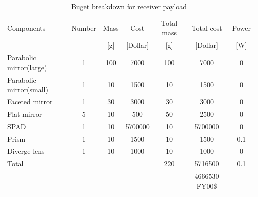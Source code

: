 \begin{table}[ht!]
\begin{tabular}{l | c | c c | c c | c }
Components         & Number & Mass & Cost      & Total mass & Total cost & Power\\ 
                   &        & [g]  & [Dollar]  & [g]        &[Dollar]    & [W]  \\ \hline\hline
Parabolic mirror(large)   & 1      & 100  & 7000      & 100        & 7000       &  0   \\
Parabolic mirror(small)   & 1      & 10   & 1500      & 10         & 1500       &  0   \\
Faceted mirror     & 1      & 30   & 3000      & 30         & 3000       &  0   \\ 
Flat mirror        & 5      & 10   & 500       & 50         & 2500       &  0   \\
\acs{SPAD}         & 1      & 10   & 5700000   & 10         & 5700000    &  0   \\
Prism              & 1      & 10   & 1500      & 10         & 1500       &  0.1 \\ 
Diverge lens       & 1      & 10   & 1000      & 10         & 1000       &  0   \\ \hline
Total              &        &      &           & 220        & 5716500    &  0.1 \\
                   &        &      &           &            & 4666530 FY00\$ &
\end{tabular}
\caption{Buget breakdown for receiver payload}
\label{tab:receiverbudget}
\end{table}